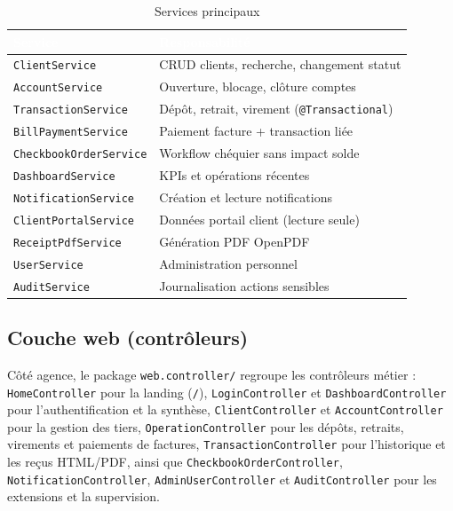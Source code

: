 \documentclass[11pt,a4paper,oneside]{report}
\newcommand{\tabhead}[1]{\textcolor{white}{\textbf{#1}}}
\begin{document}
\begin{table}[H]
    \centering
    \caption{Services principaux}
    \label{tab:services}
    \small
    \begin{tabular}{@{}lp{9cm}@{}}
        \rowcolor{AmanaBrown}
        \tabhead{Service} & \tabhead{Responsabilité} \\
        \midrule
        \texttt{ClientService} & CRUD clients, recherche, changement statut \\
        \texttt{AccountService} & Ouverture, blocage, clôture comptes \\
        \texttt{TransactionService} & Dépôt, retrait, virement (\texttt{@Transactional}) \\
        \texttt{BillPaymentService} & Paiement facture + transaction liée \\
        \texttt{CheckbookOrderService} & Workflow chéquier sans impact solde \\
        \texttt{DashboardService} & KPIs et opérations récentes \\
        \texttt{NotificationService} & Création et lecture notifications \\
        \texttt{ClientPortalService} & Données portail client (lecture seule) \\
        \texttt{ReceiptPdfService} & Génération PDF OpenPDF \\
        \texttt{UserService} & Administration personnel \\
        \texttt{AuditService} & Journalisation actions sensibles \\
        \bottomrule
    \end{tabular}
\end{table}

\subsection{Couche web (contrôleurs)}

Côté agence, le package \texttt{web.controller/} regroupe les contrôleurs métier : \texttt{HomeController} pour la landing (\texttt{/}), \texttt{LoginController} et \texttt{DashboardController} pour l'authentification et la synthèse, \texttt{ClientController} et \texttt{AccountController} pour la gestion des tiers, \texttt{OperationController} pour les dépôts, retraits, virements et paiements de factures, \texttt{TransactionController} pour l'historique et les reçus HTML/PDF, ainsi que \texttt{CheckbookOrderController}, \texttt{NotificationController}, \texttt{AdminUserController} et \texttt{AuditController} pour les extensions et la supervision.
\end{document}
